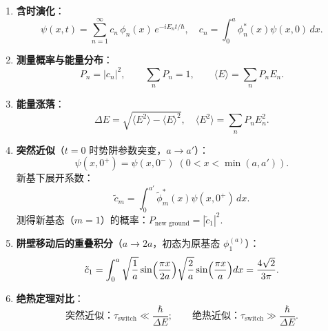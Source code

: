 \begin{formulabox}[核心公式]
\begin{enumerate}[label=\textbf{(\arabic*)}]
    \item \textbf{含时演化}：
    \[
    \psi(x,t)=\sum_{n=1}^{\infty}c_n\,\phi_n(x)\,e^{-iE_nt/\hbar},\quad
    c_n=\int_0^a\phi_n^*(x)\psi(x,0)\,dx.
    \]

    \item \textbf{测量概率与能量分布}：
    \[
    P_n=|c_n|^2,\qquad\sum_nP_n=1,\qquad\langle E\rangle=\sum_nP_nE_n.
    \]

    \item \textbf{能量涨落}：
    \[
    \Delta E=\sqrt{\langle E^2\rangle-\langle E\rangle^2},\quad
    \langle E^2\rangle=\sum_nP_nE_n^2.
    \]

    \item \textbf{突然近似}（$t=0$ 时势阱参数突变，$a\to a'$）：
    \[
    \psi(x,0^+)=\psi(x,0^-)\;(0<x<\min(a,a')).
    \]
    新基下展开系数：
    \[
    \tilde{c}_m=\int_0^{a'}\tilde{\phi}_m^*(x)\psi(x,0^+)\,dx.
    \]
    测得新基态（$m=1$）的概率：$P_{\text{new ground}}=|\tilde{c}_1|^2$.

    \item \textbf{阱壁移动后的重叠积分}（$a\to2a$，初态为原基态 $\phi_1^{(a)}$）：
    \[
    \tilde{c}_1=\int_0^a\sqrt{\frac{1}{a}}\sin\Bigl(\frac{\pi x}{2a}\Bigr)\sqrt{\frac{2}{a}}\sin\Bigl(\frac{\pi x}{a}\Bigr)dx
    =\frac{4\sqrt{2}}{3\pi}.
    \]

    \item \textbf{绝热定理对比}：
    \[
    \text{突然近似：}\tau_{\text{switch}}\ll\frac{\hbar}{\Delta E};\qquad
    \text{绝热近似：}\tau_{\text{switch}}\gg\frac{\hbar}{\Delta E}.
    \]
\end{enumerate}
\end{formulabox}

